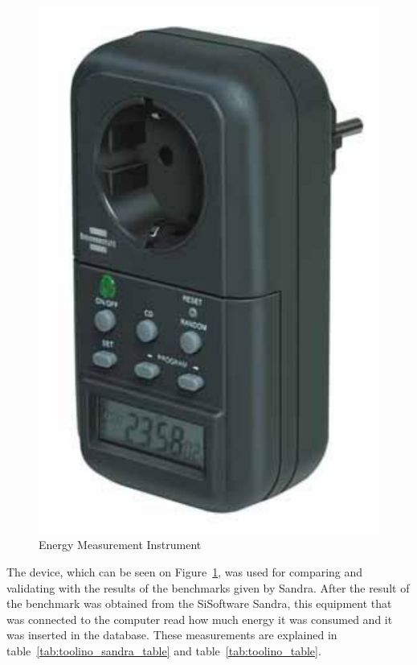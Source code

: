         \begin{figure}[htbp]
            \centering
                \includegraphics[scale=0.6]{graphics/energy_measurement_instrument}
                \caption{Energy Measurement Instrument}
                \label{fig:energy_measurement_instrument}
        \end{figure}
        The device, which can be seen on Figure~\ref{fig:energy_measurement_instrument}, was used for comparing and validating with the results of the benchmarks given by Sandra. After the result of the benchmark was obtained from the SiSoftware Sandra, this equipment that was connected to the computer read how much energy it was consumed and it was inserted in the database. These measurements are explained in table~\ref{tab:toolino_sandra_table} and table~\ref{tab:toolino_table}.
        
